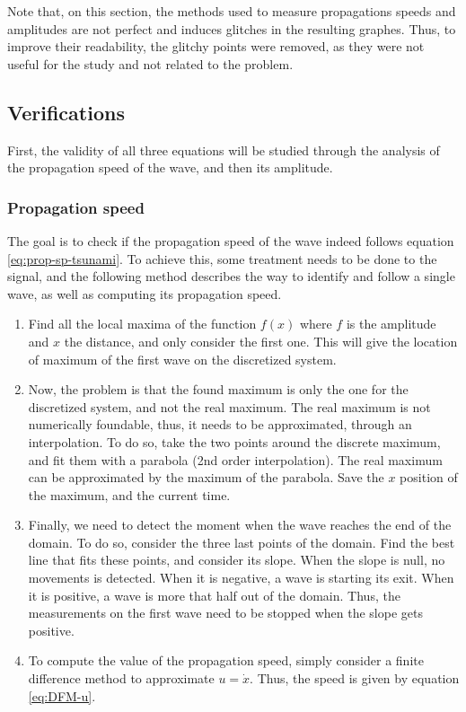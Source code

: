 \documentclass[a4paper,12pt,twoside]{article}
\begin{document}
      Note that, on this section, the methods used to measure propagations speeds and amplitudes are not perfect and induces glitches in the resulting graphes.
      Thus, to improve their readability, the glitchy points were removed, as they were not useful for the study and not related to the problem.\\

      \subsection{Verifications} %
      First, the validity of all three equations will be studied through the analysis of the propagation speed of the wave, and then its amplitude.

      \subsubsection{Propagation speed}
        The goal is to check if the propagation speed of the wave indeed follows equation \eqref{eq:prop-sp-tsunami}.
        To achieve this, some treatment needs to be done to the signal, and the following method describes the way to identify and follow a single wave, as well as computing its propagation speed.
        \begin{enumerate}
          \item Find all the local maxima of the function $f(x)$ where $f$ is the amplitude and $x$ the distance, and only consider the first one.
          This will give the location of maximum of the first wave on the discretized system.
          \item Now, the problem is that the found maximum is only the one for the discretized system, and not the real maximum.
          The real maximum is not numerically foundable, thus, it needs to be approximated, through an interpolation.
          To do so, take the two points around the discrete maximum, and fit them with a parabola (2nd order interpolation).
          The real maximum can be approximated by the maximum of the parabola.
          Save the $x$ position of the maximum, and the current time.
          \item Finally, we need to detect the moment when the wave reaches the end of the domain.
          To do so, consider the three last points of the domain.
          Find the best line that fits these points, and consider its slope.
          When the slope is null, no movements is detected.
          When it is negative, a wave is starting its exit.
          When it is positive, a wave is more that half out of the domain.
          Thus, the measurements on the first wave need to be stopped when the slope gets positive.
          \item To compute the value of the propagation speed, simply consider a finite difference method to approximate $u=\dot{x}$.
          Thus, the speed is given by equation \eqref{eq:DFM-u}.
        \end{enumerate}
\end{document}
